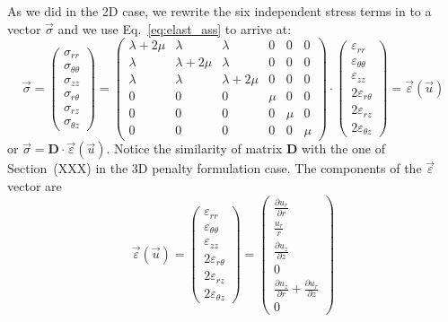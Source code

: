 As we did in the 2D case, we rewrite the six independent stress terms in to a vector $\vec\sigma$ and we use Eq.~\eqref{eq:elast_ass} to arrive at:
\[
\vec{\sigma}=
\left(
\begin{array}{c}
\sigma_{rr} \\
\sigma_{\theta\theta} \\
\sigma_{zz} \\
\sigma_{r\theta} \\
\sigma_{rz} \\
\sigma_{\theta z} 
\end{array}
\right)
=
\left(
\begin{array}{cccccc}
\lambda+2\mu & \lambda & \lambda & 0 & 0 & 0 \\
\lambda & \lambda+2\mu & \lambda & 0 & 0 & 0 \\
\lambda & \lambda & \lambda+2\mu & 0 & 0 & 0 \\
0 & 0 & 0 & \mu & 0 & 0\\
0 & 0 & 0 & 0 & \mu & 0\\
0 & 0 & 0 & 0 & 0 & \mu
\end{array}
\right)
\cdot
\left(
\begin{array}{c}
\varepsilon_{rr} \\
\varepsilon_{\theta\theta} \\
\varepsilon_{zz} \\
2\varepsilon_{r\theta} \\
2\varepsilon_{rz} \\
2\varepsilon_{\theta z} 
\end{array}
\right)
=\vec\varepsilon(\vec u)
\]
or $\vec\sigma = {\bm D} \cdot \vec\varepsilon(\vec u)$. Notice the similarity of matrix ${\bm D}$ with the one of Section~(XXX) in the 3D penalty formulation case.
The components of the $\vec\varepsilon$ vector are
\[
\vec\varepsilon(\vec u)
=
\left(
\begin{array}{c}
\varepsilon_{rr} \\
\varepsilon_{\theta\theta} \\
\varepsilon_{zz} \\
2\varepsilon_{r\theta} \\
2\varepsilon_{rz} \\
2\varepsilon_{\theta z} 
\end{array}
\right)
=
\left(
\begin{array}{c}
\frac{\partial u_r}{\partial r} \\ 
\frac{u_r}{r} \\ 
\frac{\partial u_z}{\partial z} \\ 
0 \\ 
\frac{\partial u_z}{\partial r}+\frac{\partial u_r}{\partial z} \\ 
0
\end{array}
\right)
\]
